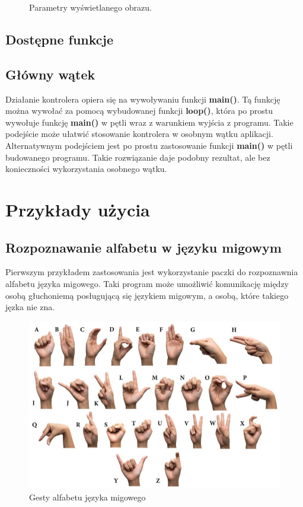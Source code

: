 \begin{figure}[H]
    \centering
    \hfill
    \caption{Parametry wyświetlanego obrazu.}
\end{figure}

\subsection{Dostępne funkcje}

\subsection{Główny wątek}
\quad Działanie kontrolera opiera się na wywoływaniu funkcji \textbf{main()}. Tą funkcję można wywołać za pomocą wybudowanej funkcji \textbf{loop()}, która po prostu wywołuje funkcję \textbf{main()} w pętli wraz z warunkiem wyjścia z programu. Takie podejście może ułatwić stosowanie kontrolera w osobnym wątku aplikacji. 
\quad Alternatywnym podejściem jest po prostu zastosowanie funkcji \textbf{main()} w pętli budowanego programu. Takie rozwiązanie daje podobny rezultat, ale bez konieczności wykorzystania osobnego wątku. 

\section{Przykłady użycia}
\subsection{Rozpoznawanie alfabetu w języku migowym}
\quad Pierwszym przykładem zastosowania jest wykorzystanie paczki do rozpoznawnia alfabetu języka migowego. Taki program może umożliwić komunikację między osobą głuchoniemą posługującą się językiem migowym, a osobą, które takiego jęzka nie zna. 


\begin{figure}[H]
    \begin{center}
        \includegraphics[width=15cm]{../images/american_sign_language.jpg}
        \caption{Gesty alfabetu języka migowego}
    \end{center}
\end{figure}

